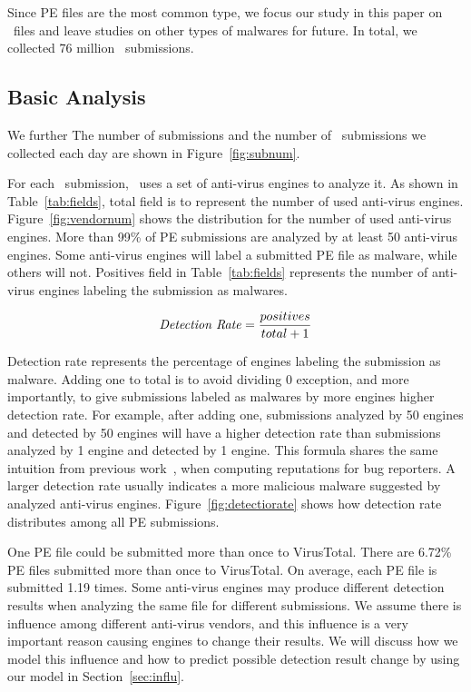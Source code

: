 Since PE files are the most common type,
we focus our study in this paper on \pe\ files 
and leave studies on other types of malwares for future. 
In total, we collected 76 million \pe\ submissions.


\subsection{Basic Analysis}
We further  
The number of submissions and the number of \pe\ submissions 
we collected each day are shown in Figure~\ref{fig:subnum}. 





For each \pe\ submission, \vt\ uses a set of anti-virus engines to analyze it.
As shown in Table~\ref{tab:fields}, 
total field is to represent the number of used anti-virus engines. 
Figure~\ref{fig:vendornum} shows the distribution for the number of used anti-virus engines. 
More than 99\% of PE submissions are analyzed by at least 50 anti-virus engines. 
Some anti-virus engines will label a submitted PE file as malware, while others will not. 
Positives field in Table~\ref{tab:fields} represents the number of anti-virus engines labeling the submission as malwares. 

$$ \textrm{\textit{Detection Rate}} = \dfrac{positives}{total + 1}$$

Detection rate represents the percentage of engines labeling the submission as malware. 
Adding one to total is to avoid dividing 0 exception, and more importantly, 
to give submissions labeled as malwares by more engines higher detection rate. 
For example, after adding one, submissions analyzed by 50 engines and detected by 50 engines will have a higher detection rate 
than submissions analyzed by 1 engine and detected by 1 engine. 
This formula shares the same intuition from previous work~\cite{GuoICSE2010}, when computing reputations for bug reporters. 
A larger detection rate usually indicates a more malicious malware suggested by analyzed anti-virus engines. 
Figure~\ref{fig:detectiorate} shows how detection rate distributes among all PE submissions. 


One PE file could be submitted more than once to VirusTotal. 
There are 6.72\% PE files submitted more than once to VirusTotal. 
On average, each PE file is submitted 1.19 times. 
Some anti-virus engines may produce different detection results when analyzing the same file for different submissions.
We assume there is influence among different anti-virus vendors, 
and this influence is a very important reason causing engines to change their results.
We will discuss how we model this influence and how to predict possible detection result change by using our model in Section~\ref{sec:influ}.

